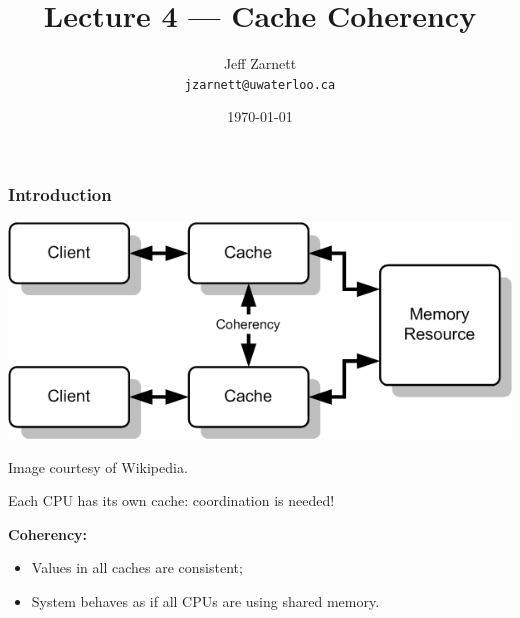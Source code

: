 

\title{Lecture 4 --- Cache Coherency }

\author{Jeff Zarnett \\ \small \texttt{jzarnett@uwaterloo.ca}}
\date{\today}




\begin{frame}
  \titlepage

 \end{frame}

\begin{frame}
  \frametitle{Introduction}

  \begin{center}
    \includegraphics[scale=0.7]{images/coherency}

    Image courtesy of Wikipedia.
  \end{center}

Each CPU has its own cache: coordination is needed!
  
  {\bf Coherency:}
  \begin{itemize}
    \item Values in all caches are consistent;
    \item System behaves as if all CPUs are using shared memory.
  \end{itemize}
  
\end{frame}

